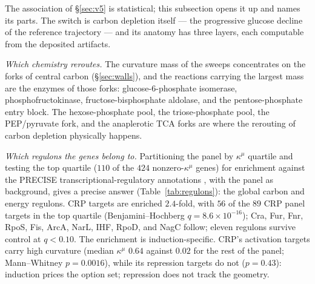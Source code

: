 \documentclass[11pt,a4paper]{article}
\theoremstyle{plain}
\theoremstyle{definition}
\theoremstyle{remark}
\newcommand{\kmu}{\kappa^{\mu}}
\begin{document}
The association of \S\ref{sec:v5} is statistical; this subsection
opens it up and names its parts. The switch is carbon depletion
itself --- the progressive glucose decline of the reference
trajectory --- and its anatomy has three layers, each computable
from the deposited artifacts.

\emph{Which chemistry reroutes.} The curvature mass of the sweeps
concentrates on the forks of central carbon
(\S\ref{sec:walls}), and the reactions carrying the largest mass
are the enzymes of those forks: glucose-6-phosphate isomerase,
phosphofructokinase, fructose-bisphosphate aldolase, and the
pentose-phosphate entry block. The hexose-phosphate pool, the
triose-phosphate pool, the PEP/pyruvate fork, and the anaplerotic
TCA forks are where the rerouting of carbon depletion physically
happens.

\emph{Which regulons the genes belong to.} Partitioning the panel
by $\kmu$ quartile and testing the top quartile ($110$ of the
$424$ nonzero-$\kmu$ genes) for enrichment against the PRECISE
transcriptional-regulatory annotations \citep{sastry2019}, with
the panel as background, gives a precise answer
(Table~\ref{tab:regulons}): the global carbon and energy regulons.
CRP targets are enriched $2.4$-fold, with $56$ of the $89$ CRP
panel targets in the top quartile (Benjamini--Hochberg $q = 8.6
\times 10^{-16}$); Cra, Fur, Fnr, RpoS, Fis, ArcA, NarL, IHF,
RpoD, and NagC follow; eleven regulons survive control at $q <
0.10$. The enrichment is induction-specific. CRP's activation
targets carry high curvature (median $\kmu$ $0.64$ against $0.02$
for the rest of the panel; Mann--Whitney $p = 0.0016$), while its
repression targets do not ($p = 0.43$): induction prices the
option set; repression does not track the geometry.
\end{document}
